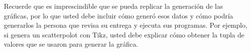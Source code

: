 \begin{mdframed}
    Recuerde que es imprescindible que se pueda replicar la generación de las gráficas, por lo que usted debe incluir cómo generó esos datos y  cómo podría generarlos la persona que revisa su entrega y ejecuta sus programas. Por ejemplo, si genera un scatterpolot con Tikz, usted debe explicar cómo obtener la tupla de valores que se usaron para generar la gráfica.
\end{mdframed}

